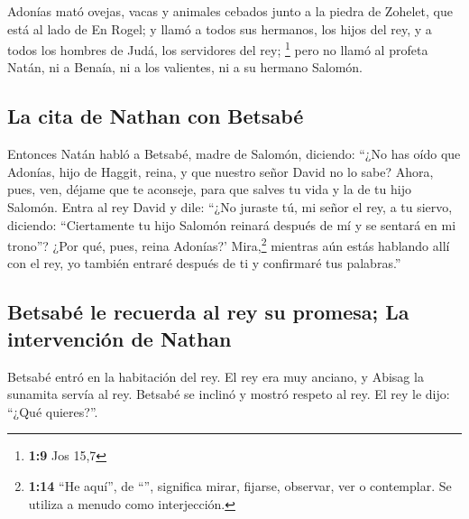 \begin{paracol}{2}
 Adonías mató ovejas, vacas y animales cebados junto a la
piedra de Zohelet, que está al lado de En Rogel; y llamó a todos sus
hermanos, los hijos del rey, y a todos los hombres de Judá, los
servidores del rey; \footnote{\textbf{1:9} Jos 15,7} 
pero no llamó al profeta Natán, ni a Benaía, ni a los valientes, ni a su
hermano Salomón.

\hypertarget{la-cita-de-nathan-con-betsabuxe9}{%
\subsection{La cita de Nathan con
Betsabé}\label{la-cita-de-nathan-con-betsabuxe9}}

 Entonces Natán habló a Betsabé, madre de Salomón,
diciendo: ``¿No has oído que Adonías, hijo de Haggit, reina, y que
nuestro señor David no lo sabe?  Ahora, pues, ven, déjame
que te aconseje, para que salves tu vida y la de tu hijo Salomón.
 Entra al rey David y dile: ``¿No juraste tú, mi señor el
rey, a tu siervo, diciendo: ``Ciertamente tu hijo Salomón reinará
después de mí y se sentará en mi trono''? ¿Por qué, pues, reina
Adonías?'  Mira,\footnote{\textbf{1:14} ``He aquí'', de
  ``'', significa mirar, fijarse, observar, ver o
  contemplar. Se utiliza a menudo como interjección.} mientras aún estás
hablando allí con el rey, yo también entraré después de ti y confirmaré
tus palabras.''

\hypertarget{betsabuxe9-le-recuerda-al-rey-su-promesa-la-intervenciuxf3n-de-nathan}{%
\subsection{Betsabé le recuerda al rey su promesa; La intervención de
Nathan}\label{betsabuxe9-le-recuerda-al-rey-su-promesa-la-intervenciuxf3n-de-nathan}}

 Betsabé entró en la habitación del rey. El rey era muy
anciano, y Abisag la sunamita servía al rey.  Betsabé se
inclinó y mostró respeto al rey. El rey le dijo: ``¿Qué quieres?''.


\end{paracol}
